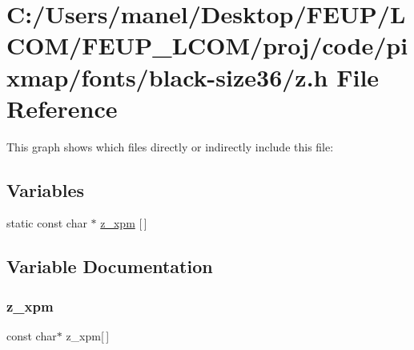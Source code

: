 \hypertarget{black-size36_2z_8h}{}\section{C\+:/\+Users/manel/\+Desktop/\+F\+E\+U\+P/\+L\+C\+O\+M/\+F\+E\+U\+P\+\_\+\+L\+C\+O\+M/proj/code/pixmap/fonts/black-\/size36/z.h File Reference}
\label{black-size36_2z_8h}
This graph shows which files directly or indirectly include this file\+:
\subsection*{Variables}
\begin{DoxyCompactItemize}
\item 
static const char $\ast$ \mbox{\hyperlink{black-size36_2z_8h_a756f262ba90652f5795d17dd212aead5}{z\+\_\+xpm}} \mbox{[}$\,$\mbox{]}
\end{DoxyCompactItemize}


\subsection{Variable Documentation}
\mbox{\label{black-size36_2z_8h_a756f262ba90652f5795d17dd212aead5}} 
\subsubsection{\texorpdfstring{z\_xpm}{z\_xpm}}
{\footnotesize\ttfamily const char$\ast$ z\+\_\+xpm\mbox{[}$\,$\mbox{]}\hspace{0.3cm}{\ttfamily [static]}}

